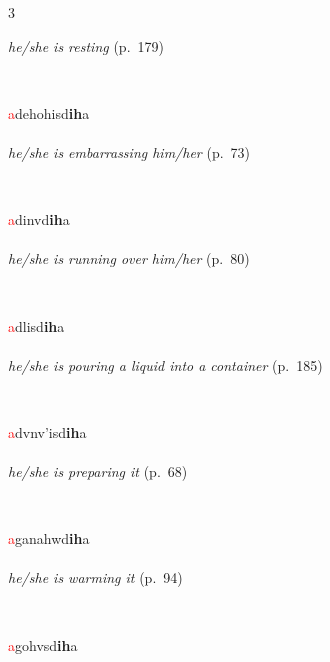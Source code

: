 \documentclass[oneside,openany]{book}%
\begin{document}
\begin{multicols}{3}
\begin{minipage}[t]{\linewidth}
\noindent \textit{he/she is resting} (p.~179)
\end{minipage}\\[1em]%
\begin{minipage}[t]{\linewidth}
\raggedright\noindent \textcolor{Red}{a}dehohisd\textbf{ih}a\\
\\
\noindent \textit{he/she is embarrassing him/her} (p.~73)
\end{minipage}\\[1em]%
\begin{minipage}[t]{\linewidth}
\raggedright\noindent \textcolor{Red}{a}dinvd\textbf{ih}a\\
\\
\noindent \textit{he/she is running over him/her} (p.~80)
\end{minipage}\\[1em]%
\begin{minipage}[t]{\linewidth}
\raggedright\noindent \textcolor{Red}{a}dlisd\textbf{ih}a\\
\\
\noindent \textit{he/she is pouring a liquid into a container} (p.~185)
\end{minipage}\\[1em]%
\begin{minipage}[t]{\linewidth}
\raggedright\noindent \textcolor{Red}{a}dvnv'isd\textbf{ih}a\\
\\
\noindent \textit{he/she is preparing it} (p.~68)
\end{minipage}\\[1em]%
\begin{minipage}[t]{\linewidth}
\raggedright\noindent \textcolor{Red}{a}ganahwd\textbf{ih}a\\
\\
\noindent \textit{he/she is warming it} (p.~94)
\end{minipage}\\[1em]%
\begin{minipage}[t]{\linewidth}
\raggedright\noindent \textcolor{Red}{a}gohvsd\textbf{ih}a\\

\end{minipage}
\end{multicols}
\end{document}
